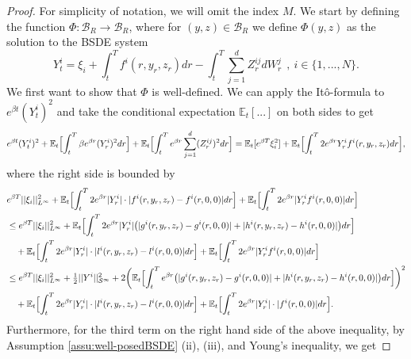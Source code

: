 \documentclass[10pt,a4paper]{article}
\newcommand{\be}{\begin{equation}}
\newcommand{\ee}{\end{equation}}
\theoremstyle{plain}
\theoremstyle{definition}
\numberwithin{equation}{section}
\begin{document}
\begin{proof}

For simplicity of notation, we will omit the index $M$. We start by defining the function $\Phi:\mathcal{B}_{R} \rightarrow \mathcal{B}_{R}$, where for $(y,z) \in \mathcal{B}_{R}$ we define $\Phi(y,z)$ as the solution to the BSDE system
\be\label{eq:solmap}
Y_{t}^{i} = \xi_{i} + \int_{t}^{T}f^{i}(r,y_{r},z_{r})dr -\int_{t}^{T}\sum_{j=1}^{d}Z_{r}^{ij}dW_{r}^{j} \ \ , \ i \in \{1,...,N\}.
\ee
We first want to show that $\Phi$ is well-defined. We can apply the Itô-formula to $e^{\beta t}(Y_{t}^{i})^{2}$ and take the conditional expectation $\mathbb{E}_{t}[...]$ on both sides to get
\[
e^{\beta t}(Y_{t}^{i})^{2} + \mathbb{E}_{t}\Bigl[\int_{t}^{T}\beta e^{\beta r}(Y_{r}^{i})^{2}dr\Bigr] + \mathbb{E}_{t}\Bigl[\int_{t}^{T}e^{\beta r}\sum_{j=1}^{d}(Z_{r}^{ij})^{2}dr\Bigr] = \mathbb{E}_{t}[e^{\beta T}\xi_{i}^{2}] + \mathbb{E}_{t}\Bigl[\int_{t}^{T}2e^{\beta r}Y_{r}^{i}f^{i}(r,y_{r},z_{r})dr\Bigr],
\]
where the right side is bounded by
\begin{align}
&e^{\beta T}||\xi_{i}||_{L^{\infty}}^{2} + \mathbb{E}_{t}\Bigl[\int_{t}^{T}2e^{\beta r}|Y_{r}^{i}| \cdot |f^{i}(r,y_{r},z_{r})-f^{i}(r,0,0)|dr\Bigr] + \mathbb{E}_{t}\Bigl[\int_{t}^{T}2e^{\beta r}|Y_{r}^{i}f^{i}(r,0,0)|dr\Bigr] \nonumber \\
&\leq e^{\beta T}||\xi_{i}||_{L^{\infty}}^{2} + \mathbb{E}_{t}\Bigl[\int_{t}^{T}2e^{\beta r}|Y_{r}^{i}|\bigl(|g^{i}(r,y_{r},z_{r})-g^{i}(r,0,0)|+|h^{i}(r,y_{r},z_{r})-h^{i}(r,0,0)|\bigr)dr\Bigr] \nonumber \\
&\ \ \ + \mathbb{E}_{t}\Bigl[\int_{t}^{T}2e^{\beta r}|Y_{r}^{i}| \cdot |l^{i}(r,y_{r},z_{r})-l^{i}(r,0,0)|dr\Bigr] + \mathbb{E}_{t}\Bigl[\int_{t}^{T}2e^{\beta r}|Y_{r}^{i}f^{i}(r,0,0)|dr\Bigr] \nonumber \\
&\leq e^{\beta T}||\xi_{i}||_{L^{\infty}}^{2} + \tfrac{1}{2}||Y^{i}||_{\mathcal{S}^{\infty}}^{2} + 2\biggr(\mathbb{E}_{t}\Bigl[\int_{t}^{T}e^{\beta r}\bigl(|g^{i}(r,y_{r},z_{r})-g^{i}(r,0,0)|+|h^{i}(r,y_{r},z_{r})-h^{i}(r,0,0)|\bigr)dr\Bigr]\biggr)^{2} \nonumber \\
& \ \ \ + \mathbb{E}_{t}\Bigl[\int_{t}^{T}2e^{\beta r}|Y_{r}^{i}| \cdot |l^{i}(r,y_{r},z_{r})-l^{i}(r,0,0)|dr\Bigr] + \mathbb{E}_{t}\Bigl[\int_{t}^{T}2e^{\beta r}|Y_{r}^{i}|\cdot |f^{i}(r,0,0)|dr\Bigr] \label{equ:misc1}.
\end{align}
Furthermore, for the third term on the right hand side of the above inequality, by Assumption \ref{assu:well-posedBSDE} (ii), (iii), and Young's inequality, we get

\end{proof}
\end{document}
